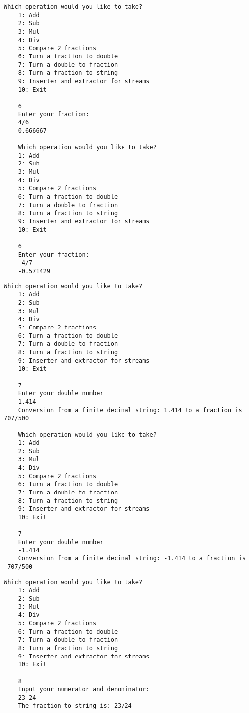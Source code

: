 \documentclass{ctexart} %
\begin{document}
\begin{lstlisting}[caption = 测试Turn a fraction to double]
    Which operation would you like to take?
    1: Add
    2: Sub
    3: Mul
    4: Div
    5: Compare 2 fractions
    6: Turn a fraction to double
    7: Turn a double to fraction
    8: Turn a fraction to string
    9: Inserter and extractor for streams
    10: Exit

    6
    Enter your fraction:
    4/6
    0.666667

    Which operation would you like to take?
    1: Add
    2: Sub
    3: Mul
    4: Div
    5: Compare 2 fractions
    6: Turn a fraction to double
    7: Turn a double to fraction
    8: Turn a fraction to string
    9: Inserter and extractor for streams
    10: Exit

    6
    Enter your fraction:
    -4/7
    -0.571429
\end{lstlisting}
\vspace{10pt}

\begin{lstlisting}[caption = 测试Turn a double to fraction]
    Which operation would you like to take?
    1: Add
    2: Sub
    3: Mul
    4: Div
    5: Compare 2 fractions
    6: Turn a fraction to double
    7: Turn a double to fraction
    8: Turn a fraction to string
    9: Inserter and extractor for streams
    10: Exit

    7
    Enter your double number
    1.414 
    Conversion from a finite decimal string: 1.414 to a fraction is 707/500

    Which operation would you like to take?
    1: Add
    2: Sub
    3: Mul
    4: Div
    5: Compare 2 fractions
    6: Turn a fraction to double
    7: Turn a double to fraction
    8: Turn a fraction to string
    9: Inserter and extractor for streams
    10: Exit

    7
    Enter your double number
    -1.414
    Conversion from a finite decimal string: -1.414 to a fraction is -707/500
\end{lstlisting}
\vspace{10pt}

\begin{lstlisting}[caption = 测试Turn a fraction to string]
    Which operation would you like to take?
    1: Add
    2: Sub
    3: Mul
    4: Div
    5: Compare 2 fractions
    6: Turn a fraction to double
    7: Turn a double to fraction
    8: Turn a fraction to string
    9: Inserter and extractor for streams
    10: Exit

    8
    Input your numerator and denominator:
    23 24
    The fraction to string is: 23/24
\end{lstlisting}
\vspace{10pt}
\end{document}
